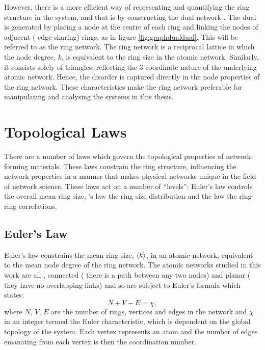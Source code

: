 However, there is a more efficient way of representing and quantifying the ring structure in the system, and that is by constructing the dual network \cite{Aboav1984}.
The dual is generated by placing a node at the centre of each ring and linking the nodes of adjacent (\ie{} edge\--sharing) rings, as in figure \ref{fig:graphdualdual}.
This will be referred to as the ring network.
The ring network is a reciprocal lattice in which the node degree, $k$, is equivalent to the ring size in the atomic network.
Similarly, it consists solely of triangles, reflecting the 3\--coordinate nature of the underlying atomic network.
Hence, the disorder is captured directly in the node properties of the ring network.
These characteristics make the ring network preferable for manipulating and analysing the systems in this thesis.

\section{Topological Laws}
\label{s:topolaws}

There are a number of laws which govern the topological properties of \td{} network\--forming materials.
These laws constrain the ring structure, influencing the network properties in a manner that makes physical networks unique in the field of network science.
These laws act on a number of ``levels'': Euler's law controls the overall mean ring size, \lm's{} law the ring size distribution and the \aw{} law the ring\--ring correlations.

\subsection{Euler's Law}
\label{s:eulerslaw}

Euler's law constrains the mean ring size, $\langle k \rangle$, in an atomic network,  equivalent to the mean node degree of the ring network.
The atomic networks studied in this work are all \td{}, connected (\ie{} there is a path between any two nodes) and planar (\ie{} they have no overlapping links) and so are subject to Euler's formula which states:
\begin{equation}
	\label{eq:eulerformula}
	N + V - E = \chi,
\end{equation}
where $N$, $V$, $E$ are the number of rings, vertices and edges in the network and $\chi$ in an integer termed the Euler characteristic, which is dependent on the global topology of the system.
Each vertex represents an atom and the number of edges emanating from each vertex is then the coordination number.

